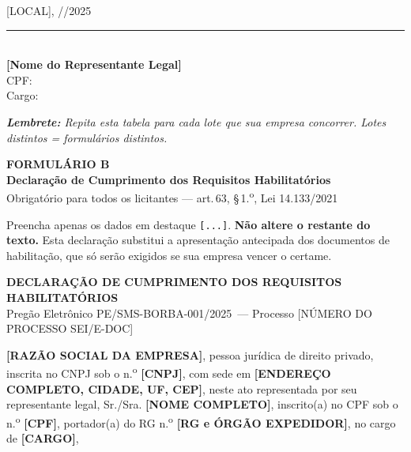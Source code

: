 \documentclass[12pt,a4paper]{article}
\newcommand{\formulario}[3]{%
  \clearpage
  \begin{tcolorbox}[enhanced,colback=navy,colframe=navy,arc=6pt,
    left=14pt,right=14pt,top=10pt,bottom=10pt]
    \color{white}
    {\large\bfseries FORMULÁRIO #1}\\[4pt]
    {\Large\bfseries #2}\\[4pt]
    {\small\color{ltblue} #3}
  \end{tcolorbox}
  \vspace{0.3cm}}
\newcommand{\blank}[1]{\underline{\hspace{#1}}}
\newcommand{\editalRef}{PE/SMS-BORBA-001/2025}
\newcommand{\procNum}{[NÚMERO DO PROCESSO SEI/E-DOC]}
\newcommand{\exercicio}{2025}
\begin{document}
\vspace{1.0cm}
\begin{minipage}{0.47\linewidth}
  \begin{center}
    [LOCAL], \blank{0.8cm}/\blank{0.8cm}/\exercicio\\[0.8cm]
    \rule{7cm}{0.5pt}\\[3pt]
    \textbf{[Nome do Representante Legal]}\\
    \small CPF: \blank{3cm}\\
    \small Cargo: \blank{3cm}
  \end{center}
\end{minipage}
\hfill
\begin{minipage}{0.47\linewidth}
  \small\itshape
  \textbf{Lembrete:} Repita esta tabela para cada lote que sua empresa
  concorrer. Lotes distintos = formulários distintos.
\end{minipage}

\formulario{B}{Declaração de Cumprimento dos Requisitos Habilitatórios}{%
  Obrigatório para todos os licitantes --- art.\,63, \S\,1.\textsuperscript{o},
  Lei 14.133/2021}

\begin{dicabox}
\small
Preencha apenas os dados em destaque \texttt{[...]}.
\textbf{Não altere o restante do texto.} Esta declaração substitui a
apresentação antecipada dos documentos de habilitação, que só serão exigidos
se sua empresa vencer o certame.
\end{dicabox}

\vspace{0.4cm}
\begin{fillbox}
\begin{center}
  {\bfseries\color{navy}DECLARAÇÃO DE CUMPRIMENTO DOS REQUISITOS
    HABILITATÓRIOS}\\[4pt]
  {\small Pregão Eletrônico \editalRef\ --- Processo \procNum}
\end{center}
\end{fillbox}

\bigskip
\noindent\textbf{[RAZÃO SOCIAL DA EMPRESA]}, pessoa jurídica de direito privado,
inscrita no CNPJ sob o n.\textsuperscript{o} \textbf{[CNPJ]}, com sede em
\textbf{[ENDEREÇO COMPLETO, CIDADE, UF, CEP]}, neste ato representada por seu
representante legal, Sr./Sra. \textbf{[NOME COMPLETO]}, inscrito(a) no CPF sob o
n.\textsuperscript{o} \textbf{[CPF]}, portador(a) do RG n.\textsuperscript{o}
\textbf{[RG e ÓRGÃO EXPEDIDOR]}, no cargo de \textbf{[CARGO]},
\end{document}
